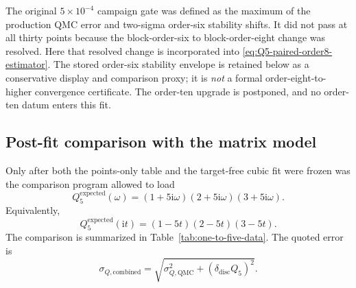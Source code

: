 \documentclass[11pt]{article}
\newcommand{\ii}{\mathrm{i}}
\newcommand{\QMC}{\mathrm{QMC}}
\begin{document}
The original $5\times10^{-4}$ campaign gate was defined as the maximum of
the production QMC error and two-sigma order-six stability shifts.  It did
not pass at all thirty points because the block-order-six to block-order-eight
change was resolved.  Here that resolved change is incorporated into
\eqref{eq:Q5-paired-order8-estimator}.  The stored order-six stability
envelope is retained below as a conservative display and comparison proxy;
it is \emph{not} a formal order-eight-to-higher convergence certificate.
The order-ten upgrade is postponed, and no order-ten datum enters this fit.

\subsection{Post-fit comparison with the matrix model}

Only after both the points-only table and the target-free cubic fit were
frozen was the comparison program allowed to load
\begin{equation}
  \boxed{
  Q_5^{\mathrm{expected}}(\omega)
  =(1+5\ii\omega)(2+5\ii\omega)(3+5\ii\omega).}
  \label{eq:Q5-expected}
\end{equation}
Equivalently,
\begin{equation}
  Q_5^{\mathrm{expected}}(\ii t)
  =(1-5t)(2-5t)(3-5t).
  \label{eq:Q5-expected-it}
\end{equation}
The comparison is summarized in Table~\ref{tab:one-to-five-data}.  The quoted
error is
\begin{equation}
  \sigma_{Q,\mathrm{combined}}
  =\sqrt{\sigma_{Q,\QMC}^2+(\delta_{\mathrm{disc}}Q_5)^2}.
  \label{eq:Q5-combined-error}
\end{equation}
\end{document}

